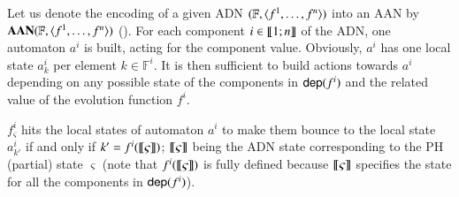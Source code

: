 Let us denote the encoding of a given ADN $(\mathbb F, \langle f^1, \dots, f^n\rangle)$ into an AAN by $\mathbf{AAN}(\mathbb F, \langle f^1, \dots, f^n\rangle)$ ().
For each component $i\in\llbracket 1; n \rrbracket$ of the ADN,
one automaton $a^i$ is built, acting for the component value.
Obviously, $a^i$ has one local state $a^i_k$ per element $k \in \mathbb F^i$.
It is then sufficient to build actions towards $a^i$
depending on any possible state of the components in $\mathsf{dep}(f^i)$
and the related value of the evolution function $f^i$.



$f^i_\varsigma$ hits the local states of automaton $a^i$ to make them bounce to the local state
$a^i_{k'}$ if and only if $k'=f^i(\llbracket\varsigma\rrbracket)$;
$\llbracket\varsigma\rrbracket$ being the ADN state corresponding to the PH (partial) state $\varsigma$ (note that
$f^i(\llbracket\varsigma\rrbracket)$ is fully defined because $\llbracket\varsigma\rrbracket$ specifies the state for all
the components in $\mathsf{dep}(f^i)$).


% 
% 

